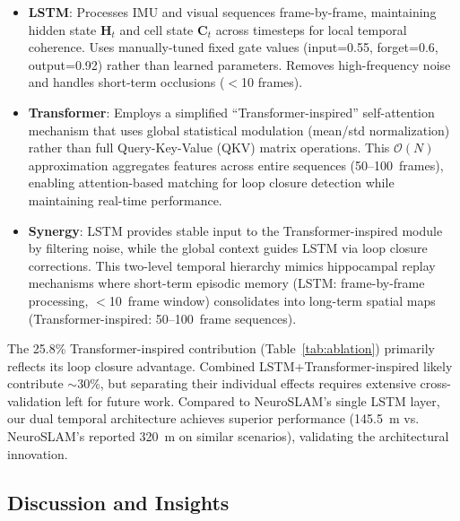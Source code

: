 \begin{itemize}
    \item \textbf{LSTM}: Processes IMU and visual sequences frame-by-frame, maintaining hidden state $\mathbf{H}_t$ and cell state $\mathbf{C}_t$ across timesteps for local temporal coherence. Uses manually-tuned fixed gate values (input=0.55, forget=0.6, output=0.92) rather than learned parameters. Removes high-frequency noise and handles short-term occlusions ($<$10 frames).

    \item \textbf{Transformer}: Employs a simplified ``Trans\-form\-er-in\-spired'' self-attention mechanism that uses global statistical modulation (mean/std normali\-zation) rather than full Query-Key-Value (QKV) matrix operations. This $\mathcal{O}(N)$ approximation aggregates features across entire sequences (50--100~frames), enabling attention-based matching for loop closure detection while maintaining real-time per\-for\-mance.

    \item \textbf{Synergy}: LSTM provides stable input to the Trans\-form\-er-in\-spired module by filtering noise, while the global context guides LSTM via loop closure corrections. This two-level temporal hierarchy mimics hippocampal replay mechanisms where short-term episodic memory (LSTM: frame-by-frame processing, $<$10~frame window) consolidates into long-term spatial maps (Trans\-form\-er-in\-spired: 50--100~frame sequences).
\end{itemize}

The 25.8\% Trans\-form\-er-in\-spired con\-tri\-bu\-tion (Table~\ref{tab:ablation}) primarily reflects its loop closure advantage. Combined LSTM+Trans\-form\-er-in\-spired likely contribute $\sim$30\%, but separating their individual effects requires extensive cross-validation left for future work. Compared to NeuroSLAM's single LSTM layer, our dual temporal architecture achieves superior per\-for\-mance (145.5~m vs. NeuroSLAM's reported 320~m on similar scenarios), validating the architectural innovation.

\subsection{Discussion and Insights}

